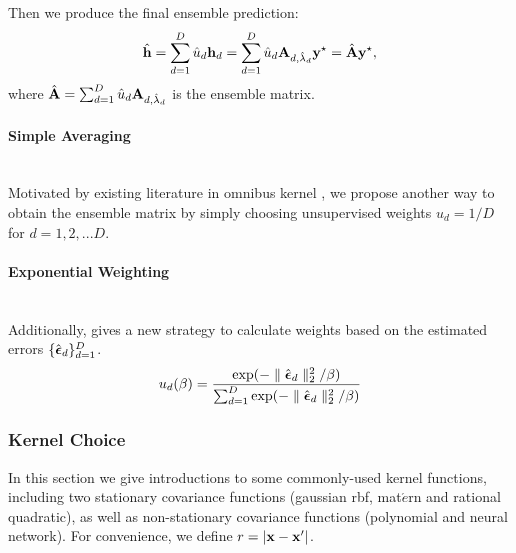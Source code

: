 \documentclass[article]{jss}
\begin{document}
Then we produce the final ensemble prediction:
\begin{align*}
\hat{{\bf h}}=\sum_{d=1}^D \hat{u}_d {\bf h}_d=\sum_{d=1}^D \hat{u}_d {\bf A}_{d,\hat{\lambda}_d}{\bf y}^\star=\hat{{\bf A}}{\bf y}^\star, 
\end{align*}
where $\hat{{\bf A}}=\sum_{d=1}^D \hat{u}_d {\bf A}_{d,\hat{\lambda}_d}$ is the ensemble matrix.

\paragraph{Simple Averaging}\mbox{}\\
Motivated by existing literature in omnibus kernel \citep{zhan_fast_2017}, we propose another way to obtain the ensemble matrix by simply choosing unsupervised weights $u_d=1/D$ for $d=1,2,...D$.

\paragraph{Exponential Weighting}\mbox{}\\
Additionally, \citep{dalalyan_aggregation_2007} gives a new strategy to calculate weights based on the estimated errors $\{\hat{\boldsymbol{\epsilon}}_d\}_{d=1}^D$. 
\begin{align*}
u_d(\beta)=\frac{\mbox{exp}(-\parallel \hat{\boldsymbol{\epsilon}}_d \parallel_2^2/\beta)}{\sum_{d=1}^D \mbox{exp}(-\parallel \hat{\boldsymbol{\epsilon}}_d \parallel_2^2/\beta)}
\end{align*}


\subsubsection{{Kernel Choice}}

In this section \citep{press_gaussian_2006} we give introductions to some commonly-used kernel functions, including two stationary covariance functions (gaussian rbf, mat$\acute{e}$rn and rational quadratic), as well as non-stationary covariance functions (polynomial and neural network). For convenience, we define $r=|{\bf x}-{\bf x}'|$.
\end{document}
